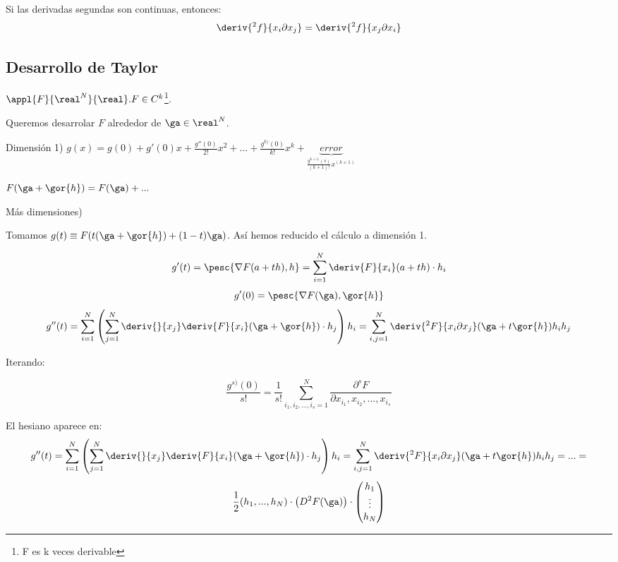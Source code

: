 \begin{theorem}
Si las derivadas segundas son continuas, entonces:
$$\deriv{^2f}{x_i\partial x_j} = \deriv{^2 f}{x_j \partial x_i}$$
\end{theorem}



\subsection{Desarrollo de Taylor}

$\appl{F}{\real^N}{\real}. F\in C^k$\footnote{F es k veces derivable}. 

Queremos desarrolar $F$ alrededor de $\ga \in \real^N$.

Dimensión 1) $g(x) = g(0) + g'(0)x + \frac{g''(0)}{2!}x^2 + ... + \frac{g^{k)}(0)}{k!}x^k + \underbrace{error}_{\frac{g^{k+1)}(s)}{(k+1)!}x^{(k+1)}}$

$F(\ga + \gor{h}) = F(\ga) + ...$

Más dimensiones) 

Tomamos $g(t) \equiv F(t(\ga + \gor{h}) + (1-t)\ga)$. Así hemos reducido el cálculo a dimensión 1.


$$g'(t) = \pesc{\nabla F(a+th),h} = \sum_{i=1}^N \deriv{F}{x_i}(a+th)\cdot h_i$$
$$g'(0) = \pesc{\nabla F(\ga), \gor{h}}$$
$$g''(t) = \sum_{i=1}^N\left(\sum_{j=1}^N \deriv{}{x_j}\deriv{F}{x_i}(\ga+\gor{h})\cdot{h_j}\right)h_i = \sum_{i,j = 1}^N \deriv{^2F}{x_i \partial x_j}(\ga+t\gor{h})h_ih_j $$

Iterando:

$$\frac{g^{s)} (0)}{s!} = \frac{1}{s!}\sum_{i_1,i_2,...,i_s=1}^N \frac{\partial^s F}{\partial x_{i_1},x_{i_2},...,x_{i_s}}
$$%
                                                                                          
El hesiano aparece en:
$$g''(t) = \sum_{i=1}^N\left(\sum_{j=1}^N \deriv{}{x_j}\deriv{F}{x_i}(\ga+\gor{h})\cdot{h_j}\right)h_i = \sum_{i,j = 1}^N \deriv{^2F}{x_i \partial x_j}(\ga+t\gor{h})h_ih_j = ... =
$$$$\frac{1}{2} (h_1,...,h_N) \cdot \left(D^2F(\ga)\right) \cdot \begin{pmatrix}
h_1\\
\vdots\\
h_N                                                                                                                                                                                                                                       \end{pmatrix}
$$

